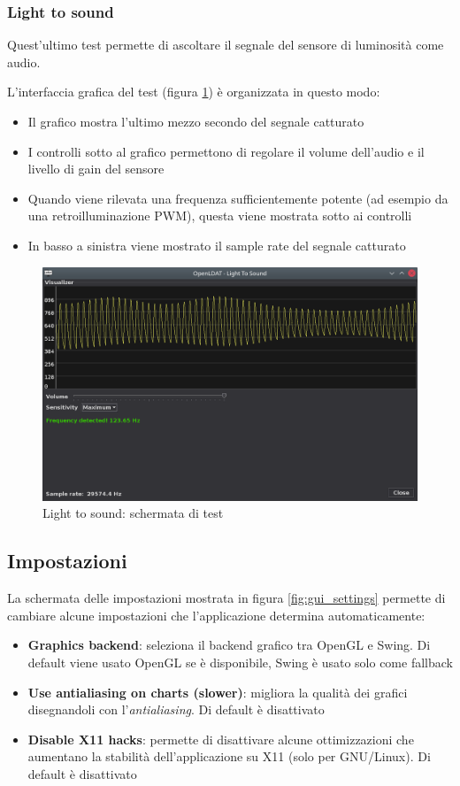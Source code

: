 \subsubsection{Light to sound}
Quest'ultimo test permette di ascoltare il segnale del sensore di luminosità come audio.

L'interfaccia grafica del test (figura \ref{fig:gui_lighttosound_results}) è organizzata in questo modo:\begin{itemize}
	\item Il grafico mostra l'ultimo mezzo secondo del segnale catturato
	\item I controlli sotto al grafico permettono di regolare il volume dell'audio e il livello di gain del sensore
	\item Quando viene rilevata una frequenza sufficientemente potente (ad esempio da una retroilluminazione PWM), questa viene mostrata sotto ai controlli
	\item In basso a sinistra viene mostrato il sample rate del segnale catturato
\end{itemize}

\begin{figure}[H]
	\centering
	\includegraphics[width=\textwidth]{Applicazione_files/gui_lighttosound_results.png}
	\caption{Light to sound: schermata di test}
	\label{fig:gui_lighttosound_results}
\end{figure}

\subsection{Impostazioni}
La schermata delle impostazioni mostrata in figura \ref{fig:gui_settings} permette di cambiare alcune impostazioni che l'applicazione determina automaticamente:\begin{itemize}
	\item \textbf{Graphics backend}: seleziona il backend grafico tra OpenGL e Swing. Di default viene usato OpenGL se è disponibile, Swing è usato solo come fallback
	\item \textbf{Use antialiasing on charts (slower)}: migliora la qualità dei grafici disegnandoli con l'\textit{antialiasing}. Di default è disattivato
	\item \textbf{Disable X11 hacks}: permette di disattivare alcune ottimizzazioni che aumentano la stabilità dell'applicazione su X11 (solo per GNU/Linux). Di default è disattivato
\end{itemize}

